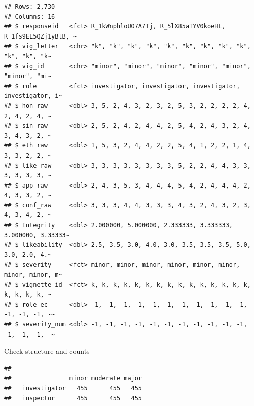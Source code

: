 \documentclass[
]{article}
\newenvironment{Shaded}{\begin{snugshade}}{\end{snugshade}}
\newcommand{\FunctionTok}[1]{\textcolor[rgb]{0.13,0.29,0.53}{\textbf{#1}}}
\newcommand{\NormalTok}[1]{#1}
\newcommand{\SpecialCharTok}[1]{\textcolor[rgb]{0.81,0.36,0.00}{\textbf{#1}}}
\begin{document}
\begin{verbatim}
## Rows: 2,730
## Columns: 16
## $ responseid   <fct> R_1kWnphloUO7A7Tj, R_5lX85aTYV0koeHL, R_1fs9EL5QZj1yBtB, ~
## $ vig_letter   <chr> "k", "k", "k", "k", "k", "k", "k", "k", "k", "k", "k", "k~
## $ vig_id       <chr> "minor", "minor", "minor", "minor", "minor", "minor", "mi~
## $ role         <fct> investigator, investigator, investigator, investigator, i~
## $ hon_raw      <dbl> 3, 5, 2, 4, 3, 2, 3, 2, 5, 3, 2, 2, 2, 2, 4, 2, 4, 2, 4, ~
## $ sin_raw      <dbl> 2, 5, 2, 4, 2, 4, 4, 2, 5, 4, 2, 4, 3, 2, 4, 3, 4, 3, 2, ~
## $ eth_raw      <dbl> 1, 5, 3, 2, 4, 4, 2, 2, 5, 4, 1, 2, 2, 1, 4, 3, 3, 2, 2, ~
## $ like_raw     <dbl> 3, 3, 3, 3, 3, 3, 3, 3, 5, 2, 2, 4, 4, 3, 3, 3, 3, 3, 3, ~
## $ app_raw      <dbl> 2, 4, 3, 5, 3, 4, 4, 4, 5, 4, 2, 4, 4, 4, 2, 4, 3, 3, 2, ~
## $ conf_raw     <dbl> 3, 3, 3, 4, 4, 3, 3, 3, 4, 3, 2, 4, 3, 2, 3, 4, 3, 4, 2, ~
## $ Integrity    <dbl> 2.000000, 5.000000, 2.333333, 3.333333, 3.000000, 3.33333~
## $ likeability  <dbl> 2.5, 3.5, 3.0, 4.0, 3.0, 3.5, 3.5, 3.5, 5.0, 3.0, 2.0, 4.~
## $ severity     <fct> minor, minor, minor, minor, minor, minor, minor, minor, m~
## $ vignette_id  <fct> k, k, k, k, k, k, k, k, k, k, k, k, k, k, k, k, k, k, k, ~
## $ role_ec      <dbl> -1, -1, -1, -1, -1, -1, -1, -1, -1, -1, -1, -1, -1, -1, -~
## $ severity_num <dbl> -1, -1, -1, -1, -1, -1, -1, -1, -1, -1, -1, -1, -1, -1, -~
\end{verbatim}

Check structure and counts

\begin{Shaded}
\end{Shaded}

\begin{verbatim}
##               
##                minor moderate major
##   investigator   455      455   455
##   inspector      455      455   455
\end{verbatim}
\end{document}
